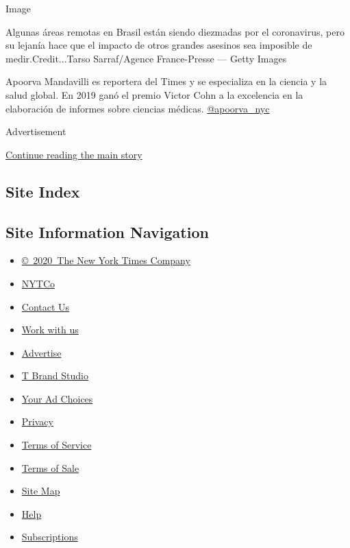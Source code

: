 Image

Algunas áreas remotas en Brasil están siendo diezmadas por el
coronavirus, pero su lejanía hace que el impacto de otros grandes
asesinos sea imposible de medir.Credit...Tarso Sarraf/Agence
France-Presse --- Getty Images

Apoorva Mandavilli es reportera del Times y se especializa en la ciencia
y la salud global. En 2019 ganó el premio Victor Cohn a la excelencia en
la elaboración de informes sobre ciencias médicas.
\href{https://twitter.com/apoorva_nyc}{@apoorva\_nyc}

Advertisement

\protect\hyperlink{after-bottom}{Continue reading the main story}

\hypertarget{site-index}{%
\subsection{Site Index}\label{site-index}}

\hypertarget{site-information-navigation}{%
\subsection{Site Information
Navigation}\label{site-information-navigation}}

\begin{itemize}
\tightlist
\item
  \href{https://help.nytimes3xbfgragh.onion/hc/en-us/articles/115014792127-Copyright-notice}{©~2020~The
  New York Times Company}
\end{itemize}

\begin{itemize}
\tightlist
\item
  \href{https://www.nytco.com/}{NYTCo}
\item
  \href{https://help.nytimes3xbfgragh.onion/hc/en-us/articles/115015385887-Contact-Us}{Contact
  Us}
\item
  \href{https://www.nytco.com/careers/}{Work with us}
\item
  \href{https://nytmediakit.com/}{Advertise}
\item
  \href{http://www.tbrandstudio.com/}{T Brand Studio}
\item
  \href{https://www.nytimes3xbfgragh.onion/privacy/cookie-policy\#how-do-i-manage-trackers}{Your
  Ad Choices}
\item
  \href{https://www.nytimes3xbfgragh.onion/privacy}{Privacy}
\item
  \href{https://help.nytimes3xbfgragh.onion/hc/en-us/articles/115014893428-Terms-of-service}{Terms
  of Service}
\item
  \href{https://help.nytimes3xbfgragh.onion/hc/en-us/articles/115014893968-Terms-of-sale}{Terms
  of Sale}
\item
  \href{https://spiderbites.nytimes3xbfgragh.onion}{Site Map}
\item
  \href{https://help.nytimes3xbfgragh.onion/hc/en-us}{Help}
\item
  \href{https://www.nytimes3xbfgragh.onion/subscription?campaignId=37WXW}{Subscriptions}
\end{itemize}
